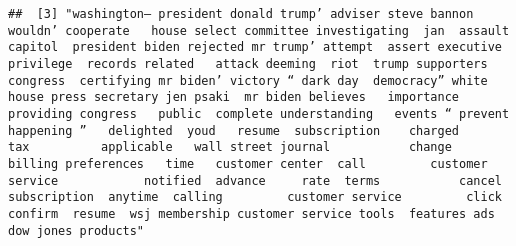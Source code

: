 \documentclass[
]{article}
\begin{document}
\begin{verbatim}
##  [3] "washington— president donald trump’ adviser steve bannon   wouldn’ cooperate   house select committee investigating  jan  assault    capitol  president biden rejected mr trump’ attempt  assert executive privilege  records related   attack deeming  riot  trump supporters  congress  certifying mr biden’ victory “ dark day  democracy” white house press secretary jen psaki  mr biden believes   importance  providing congress   public  complete understanding   events “ prevent   happening ”   delighted  youd   resume  subscription    charged           tax          applicable   wall street journal           change  billing preferences   time   customer center  call         customer service            notified  advance     rate  terms           cancel  subscription  anytime  calling         customer service         click confirm  resume  wsj membership customer service tools  features ads  dow jones products"                                                                                                                                                                                                                                                                                                                                                                                                                                                                                                                                                                                                                                                                                                                                                                                                                                                                                                                                                                                                                                                                                                                                                                                                                                                                                                                                                                                                                                                                                                                                                                                                                                                                                                                                                                                                                                                                                                                                                                                                                                                                                                                                                                                                                                                                                                                                                                                                                                                                                            
\end{verbatim}
\end{document}
